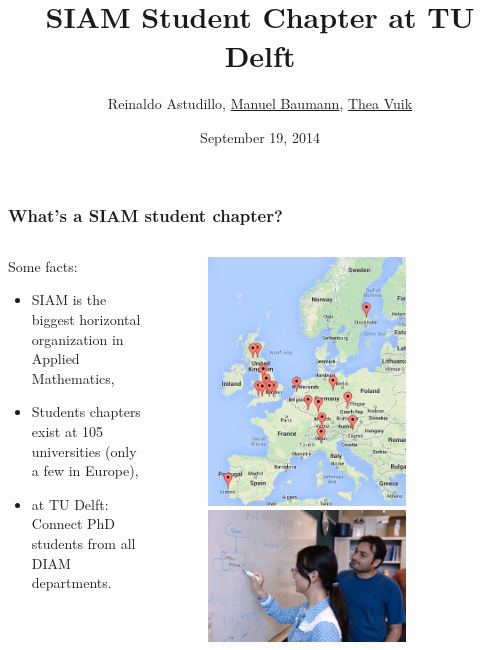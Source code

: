 \documentclass{beamer}
\title{\huge{SIAM Student Chapter at TU Delft}}
\author{Reinaldo Astudillo, \underline{Manuel Baumann}, \underline{Thea Vuik}}
\date{\footnotesize{September 19, 2014}}
\begin{document}
\frame{\titlepage}
\begin{frame}
\frametitle{What's a SIAM student chapter?}
\begin{columns}
 \begin{column}{0.7\textwidth}
 Some facts:
 \begin{itemize}
  \item SIAM is the biggest horizontal organization in Applied Mathematics,
  \item Students chapters exist at 105 universities (only a few in Europe),
  \item at TU Delft: Connect PhD students from all DIAM departments.
 \end{itemize}

 \end{column}

 \begin{column}{0.4\textwidth}
  \begin{figure}[t]
  \centering
  \includegraphics[width=0.75\textwidth]{images/map} \vspace{0.6cm}\\
  \includegraphics[width=0.75\textwidth]{images/whiteboard1}
  \end{figure}
 \end{column}
 \end{columns}
\end{frame}
\end{document}
